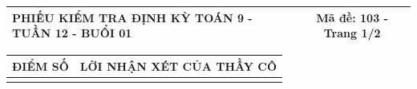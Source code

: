 \documentclass[12pt,a4paper]{article}
\begin{document}
\newpage
\noindent
\begin{tabularx}{\linewidth}{|X|c|}
\hline
\textbf{PHIẾU KIỂM TRA ĐỊNH KỲ TOÁN 9 - TUẦN 12 - BUỔI 01} & \textbf{Mã đề: 103 - Trang 1/2} \\
\hline
\end{tabularx}

\vspace{1.0mm}

\noindent
\begin{tabularx}{\linewidth}{|p{3.2cm}|X|}
\hline
\centering\textbf{ĐIỂM SỐ} & \centering\textbf{LỜI NHẬN XÉT CỦA THẦY CÔ} \tabularnewline
\hline
\rule{0pt}{1.8cm} & \tabularnewline
\hline
\end{tabularx}
\end{document}
